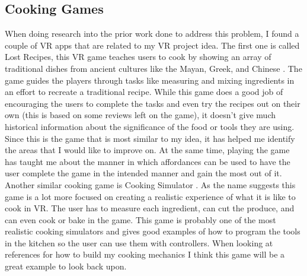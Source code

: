 \documentclass[11pt,twocolumn]{article}
\begin{document}
\subsection{Cooking Games}
When doing research into the prior work done to address this problem, I found a couple of VR apps that are related to my VR project idea. The first one is called Lost Recipes, this VR game teaches users to cook by showing an array of traditional dishes from ancient cultures like the Mayan, Greek, and Chinese \cite{lostrecipes2022}. The game guides the players through tasks like measuring and mixing ingredients in an effort to recreate a traditional recipe. While this game does a good job of encouraging the users to complete the tasks and even try the recipes out on their own (this is based on some reviews left on the game), it doesn’t give much historical information about the significance of the food or tools they are using. Since this is the game that is most similar to my idea, it has helped me identify the areas that I would like to improve on. At the same time, playing the game has taught me about the manner in which affordances can be used to have the user complete the game in the intended manner and gain the most out of it. Another similar cooking game is Cooking Simulator \cite{cookingsim2019}. As the name suggests this game is a lot more focused on creating a realistic experience of what it is like to cook in VR. The user has to measure each ingredient, can cut the produce, and can even cook or bake in the game. This game is probably one of the most realistic cooking simulators and gives good examples of how to program the tools in the kitchen so the user can use them with controllers. When looking at references for how to build my cooking mechanics I think this game will be a great example to look back upon. 
\end{document}
